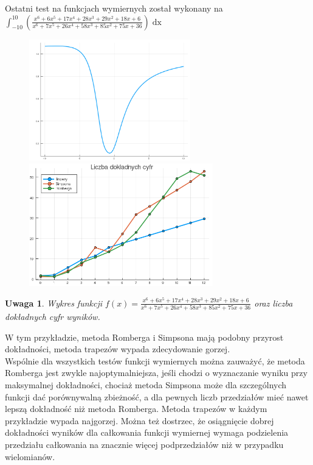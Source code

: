 \documentclass[11pt,wide]{article}
\newtheorem{remark}{Uwaga}
\begin{document}
Ostatni test na funkcjach wymiernych został wykonany na \\ \(\displaystyle \int_{-10}^{10} \left(\frac{x^6 + 6x^5 + 17x^4 + 28x^3 + 29x^2 + 18x + 6}{x^6 + 7x^5 + 26x^4 + 58x^3 + 85x^2 + 75x + 36}\right)\mathop{dx} \)
\begin{figure}[h!]
	\includegraphics[width=70mm,scale=0.5]{wym4}
	\includegraphics[width=80mm,scale=0.5]{wym_blad4}
\end{figure}
\begin{remark}
\centering
Wykres funkcji \(\displaystyle f(x) = \frac{x^6 + 6x^5 + 17x^4 + 28x^3 + 29x^2 + 18x + 6}{x^6 + 7x^5 + 26x^4 + 58x^3 + 85x^2 + 75x + 36} \) oraz liczba dokładnych cyfr wyników.
\end{remark}
W tym przykładzie, metoda Romberga i Simpsona mają podobny przyrost dokładności, metoda trapezów wypada zdecydowanie gorzej. \\

Wspólnie dla wszystkich testów funkcji wymiernych można zauważyć, że metoda Romberga jest zwykle najoptymalniejsza, jeśli chodzi o wyznaczanie wyniku przy maksymalnej dokładności, chociaż metoda Simpsona może dla szczególnych funkcji dać porównywalną zbieżność, a dla pewnych liczb przedziałów mieć nawet lepszą dokładność niż metoda Romberga. Metoda trapezów w każdym przykładzie wypada najgorzej. Można też dostrzec, że osiągnięcie dobrej dokładności wyników dla całkowania funkcji wymiernej wymaga podzielenia przedziału całkowania na znacznie więcej podprzedziałów niż w przypadku wielomianów.
\end{document}
